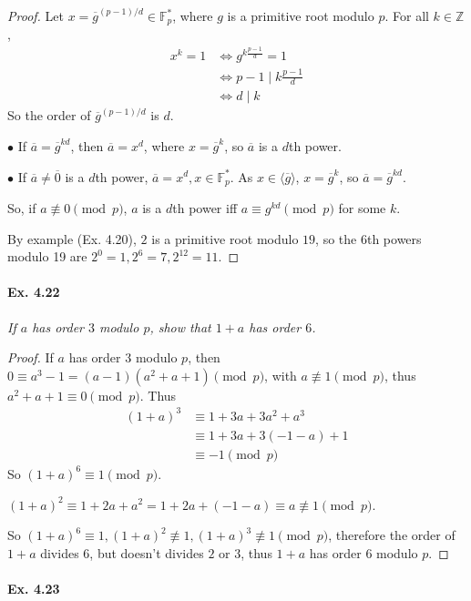 \documentclass[11pt,a4paper]{article}
\newcommand{\Z}{\mathbb{Z}}
\newcommand{\F}{\mathbb{F}}
\begin{document}
\begin{proof}
Let $x = \overline{g}^{(p-1)/d} \in \F_p^*$, where $g$ is a primitive root modulo $p$. For all $k \in \Z$, 
\begin{align*}
x^k = 1 &\iff g^{k \frac{p-1}{d}} = 1\\
&\iff p-1 \mid k \frac{p-1}{d}\\
&\iff d \mid k
\end{align*}
So the order of $\overline{g}^{(p-1)/d}$ is $d$.

$\bullet$ If $\overline{a} = \overline{g}^{kd}$, then $\overline{a} = x^d$, where $x =\overline{g}^k$, so $\overline{a}$ is a $d$th power.

$\bullet$ If $\overline{a}\neq \overline{0}$ is a $d$th power, $\overline{a} = x^d, x \in \F_p^*$. As $x \in \langle \overline{g} \rangle$, $x = \overline{g}^k$, so $\overline{a} = \overline{g}^{kd}$.

So, if $a\not \equiv 0 \pmod p$, $a$ is a $d$th power iff $a \equiv g^{kd} \pmod p$ for some $k$.

By example (Ex. 4.20), $2$ is a primitive root modulo $19$, so the 6th powers modulo 19 are $2^0 = 1,2^6 = 7,2^{12} = 11$.
\end{proof}

\paragraph{Ex. 4.22}

{\it If $a$ has order $3$ modulo $p$, show that $1+a$ has order $6$.
}
\begin{proof}
If $a$ has order $3$ modulo $p$, then $0 \equiv a^3-1 = (a-1)(a^2+a+1) \pmod p$, with $a\not \equiv 1 \pmod p$, thus $a^2+a+1 \equiv 0 \pmod p$. Thus
\begin{align*}
(1+a)^3 &\equiv 1 + 3a +3a^2+a^3\\
&\equiv 1 + 3a +3(-1-a)+1\\
&\equiv -1 \pmod p
\end{align*}
So $(1+a)^6 \equiv 1 \pmod p$.

$(1+a)^2 \equiv 1+2a+a^2 =1+2a+(-1-a) \equiv a \not \equiv 1 \pmod p$. 

So $(1+a)^6 \equiv 1,  (1+a)^2 \not \equiv 1, (1+a)^3 \not \equiv 1 \pmod p$, therefore the order of $1+a$ divides $6$, but doesn't divides $2$ or $3$, thus $1+a$ has order $6$ modulo $p$.
\end{proof}

\paragraph{Ex. 4.23}
\end{document}
